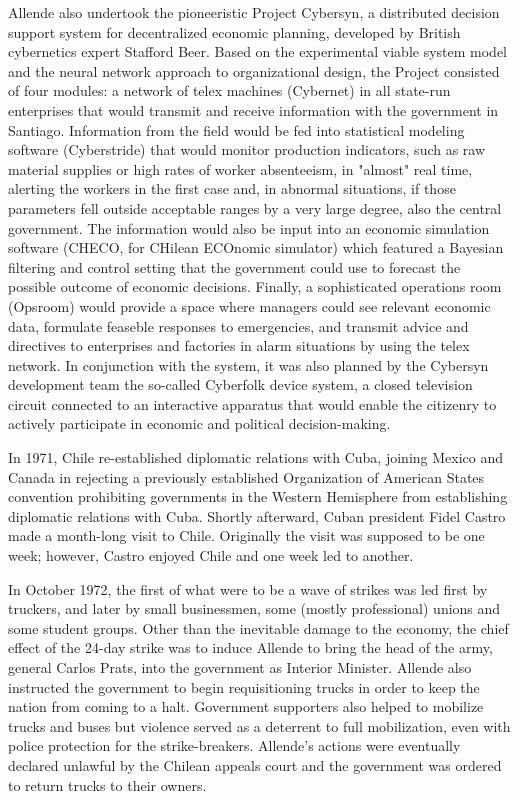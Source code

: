 Allende also undertook the pioneeristic Project Cybersyn, a distributed
decision support system for decentralized economic planning, developed
by British cybernetics expert Stafford Beer. Based on the experimental
viable system model and the neural network approach to organizational
design, the Project consisted of four modules: a network of telex
machines (Cybernet) in all state-run enterprises that would transmit and
receive information with the government in Santiago. Information from
the field would be fed into statistical modeling software (Cyberstride)
that would monitor production indicators, such as raw material supplies
or high rates of worker absenteeism, in "almost" real time, alerting the
workers in the first case and, in abnormal situations, if those
parameters fell outside acceptable ranges by a very large degree, also
the central government. The information would also be input into an
economic simulation software (CHECO, for CHilean ECOnomic simulator)
which featured a Bayesian filtering and control setting that the
government could use to forecast the possible outcome of economic
decisions. Finally, a sophisticated operations room (Opsroom) would
provide a space where managers could see relevant economic data,
formulate feaseble responses to emergencies, and transmit advice and
directives to enterprises and factories in alarm situations by using the
telex network. In conjunction with the system, it was also planned by
the Cybersyn development team the so-called Cyberfolk device system, a
closed television circuit connected to an interactive apparatus that
would enable the citizenry to actively participate in economic and
political decision-making.

In 1971, Chile re-established diplomatic relations with Cuba, joining
Mexico and Canada in rejecting a previously established Organization of
American States convention prohibiting governments in the Western
Hemisphere from establishing diplomatic relations with Cuba. Shortly
afterward, Cuban president Fidel Castro made a month-long visit to
Chile. Originally the visit was supposed to be one week; however, Castro
enjoyed Chile and one week led to another.

In October 1972, the first of what were to be a wave of strikes was led
first by truckers, and later by small businessmen, some (mostly
professional) unions and some student groups. Other than the inevitable
damage to the economy, the chief effect of the 24-day strike was to
induce Allende to bring the head of the army, general Carlos Prats, into
the government as Interior Minister. Allende also instructed the
government to begin requisitioning trucks in order to keep the nation
from coming to a halt. Government supporters also helped to mobilize
trucks and buses but violence served as a deterrent to full
mobilization, even with police protection for the strike-breakers.
Allende's actions were eventually declared unlawful by the Chilean
appeals court and the government was ordered to return trucks to their
owners.

